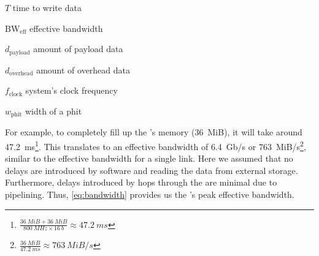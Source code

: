 \begin{eqexpl}[15mm]
    \item{$T$} time to write data
    \item{$\text{BW}_{\text{eff}}$} effective bandwidth
    \item{$d_{\text{payload}}$} amount of payload data
    \item{$d_{\text{overhead}}$} amount of overhead data
    \item{$f_{\text{clock}}$} system's clock frequency
    \item{$w_{\text{phit}}$} width of a phit
\end{eqexpl}

For example, to completely fill up the \graicore{}'s memory (\SI{36}{MiB}), it will take around \SI{47.2}{ms}\footnote{$\frac{\SI{36}{MiB} + \SI{36}{MiB}}{\SI{800}{MHz} \times \SI{16}{b}} \approx \SI{47.2}{ms}$}.
This translates to an effective bandwidth of \SI{6.4}{Gb/s} or \SI{763}{MiB/s}\footnote{$\frac{\SI{36}{MiB}}{\SI{47.2}{ms}} \approx \SI{763}{MiB/s}$}, similar to the effective bandwidth for a single link.
Here we assumed that no delays are introduced by software and reading the data from external storage.
Furthermore, delays introduced by hops through the \confignoc{} are minimal due to pipelining.
Thus, \cref{eq:bandwidth} provides us the \confignoc{}'s peak effective bandwidth.
